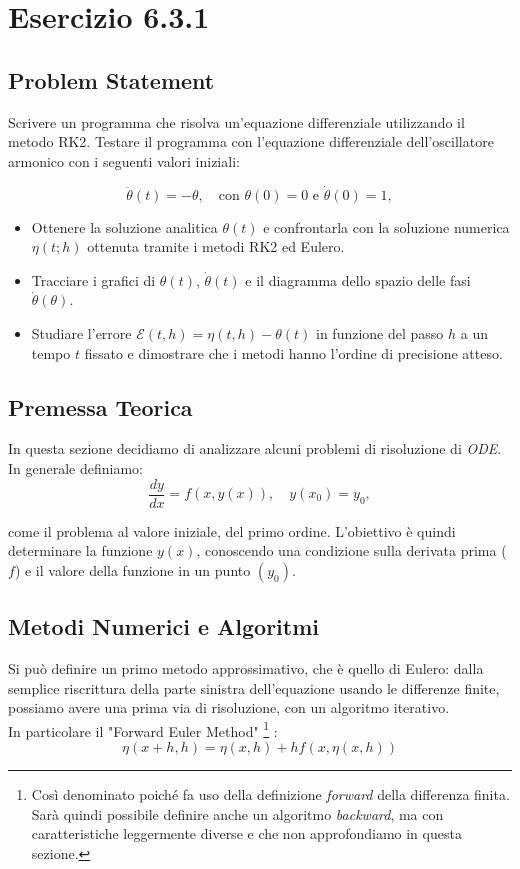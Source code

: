


\section{Esercizio 6.3.1}

\subsection{Problem Statement}
Scrivere un programma che risolva un'equazione differenziale utilizzando il metodo RK2.
\noindent Testare il programma con l'equazione differenziale dell'oscillatore armonico con i seguenti valori iniziali:

\[
\ddot{\theta}(t) = -\theta, \quad \text{con } \theta(0) = 0 \text{ e } \dot{\theta}(0) = 1,
\]

\begin{itemize}
    \item Ottenere la soluzione analitica $\theta(t)$ e confrontarla con la soluzione numerica $\eta(t; h)$ ottenuta tramite i metodi RK2 ed Eulero.
    \item Tracciare i grafici di $\theta(t)$, $\dot{\theta}(t)$ e il diagramma dello spazio delle fasi $\dot{\theta}(\theta)$.
    \item Studiare l'errore $\mathcal{E}(t, h) = \eta(t, h) - \theta(t)$ in funzione del passo $h$ a un tempo $t$ fissato e dimostrare che i metodi hanno l'ordine di precisione atteso.
\end{itemize}


\subsection{Premessa Teorica}
In questa sezione decidiamo di analizzare alcuni problemi di risoluzione di \textit{ODE}. In generale definiamo:
\[
\frac{d y}{dx} = f(x, y(x)), \quad y(x_0) = y_0,
\]

come il problema al valore iniziale, del primo ordine. L'obiettivo è quindi determinare la funzione $y(x)$, conoscendo una condizione sulla derivata prima ($f$) e il valore della funzione in un punto $(y_0)$.

\subsection{Metodi Numerici e Algoritmi}
Si può definire un primo metodo approssimativo, che è quello di Eulero: dalla semplice riscrittura della parte sinistra dell'equazione usando le differenze finite, possiamo avere una prima via di risoluzione, con un algoritmo iterativo.\\
In particolare il "Forward Euler Method"
\footnote{
Così denominato poiché fa uso della definizione \textit{forward} della differenza finita. Sarà quindi possibile definire anche un algoritmo \textit{backward}, ma con caratteristiche leggermente diverse e che non approfondiamo in questa sezione.
}
:
\[
    \eta(x+h, h) = \eta(x,h) + h f(x, \eta(x,h))
\]

